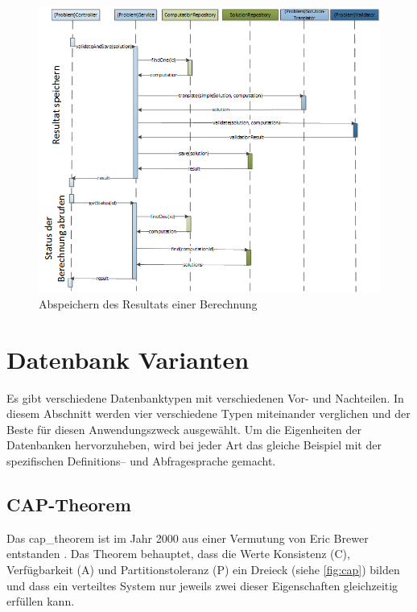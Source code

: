 \begin{figure}[h]
\centering
\includegraphics[scale=0.72]{images/visio/sequenz_diagramm_result.png}
\caption[Abspeichern des Resultats einer Berechnung]{Abspeichern des Resultats einer Berechnung \selfmade{}}
\label{fig:sequenz_diagramm_result}
\end{figure}

\section{Datenbank Varianten}\label{db_varianten}
Es gibt verschiedene Datenbanktypen mit verschiedenen Vor- und Nachteilen. In diesem Abschnitt werden vier verschiedene Typen miteinander verglichen und der Beste für diesen 
Anwendungszweck ausgewählt. Um die Eigenheiten der Datenbanken hervorzuheben, wird bei jeder Art das gleiche Beispiel mit der spezifischen Definitions-- und Abfragesprache gemacht.

\subsection{CAP-Theorem}\label{cap_theorem}
Das \gls{cap_theorem} ist im Jahr 2000 aus einer Vermutung von Eric Brewer entstanden \cite{cap_brewer}. Das Theorem behauptet, dass die Werte Konsistenz (C), Verfügbarkeit (A) und 
Partitionstoleranz (P) ein Dreieck (siehe \autoref{fig:cap}) bilden und dass ein verteiltes System nur jeweils zwei dieser Eigenschaften gleichzeitig erfüllen kann.

